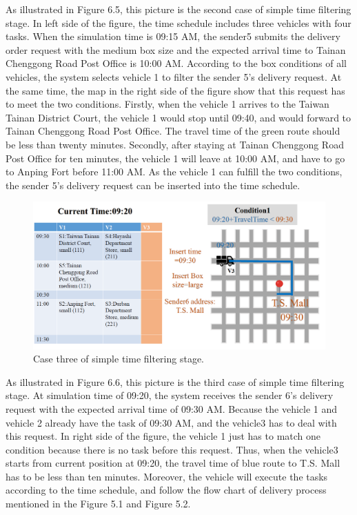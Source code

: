 \documentclass[12pt]{ksthesis}
\begin{document}
\begin{thesis}
{As illustrated in Figure 6.5, this picture is the second case of simple time filtering stage. In left side of the figure, the time schedule includes three vehicles with four tasks. When the simulation time is 09:15 AM, the sender5 submits the delivery order request with the medium box size and the expected arrival time to Tainan Chenggong Road Post Office is 10:00 AM.
According to the box conditions of all vehicles, the system selects vehicle 1 to filter the sender 5’s delivery request. At the same time, the map in the right side of the figure show that this request has to meet the two conditions. Firstly, when the vehicle 1 arrives to the Taiwan Tainan District Court, the vehicle 1 would stop until 09:40, and would forward to Tainan Chenggong Road Post Office. The travel time of the green route should be less than twenty minutes. Secondly, after staying at Tainan Chenggong Road Post Office for ten minutes, the vehicle 1 will leave at 10:00 AM, and have to go to Anping Fort before 11:00 AM. 
As the vehicle 1 can fulfill the two conditions, the sender 5’s delivery request can be inserted into the time schedule.




\begin{figure}[H]
\centering
\includegraphics[width=1.14\textwidth]{./Thesis_figures/F6-6_caseThree_SchedulingStage.PNG}
\caption{\large Case three of simple time filtering stage.}
\vspace{0.5cm}
\label{Fig:CaseThree_TimeFiltering}
\end{figure}

As illustrated in Figure 6.6, this picture is the third case of simple time filtering stage. At simulation time of 09:20, the system receives the sender 6’s delivery request with the expected arrival time of 09:30 AM. Because the vehicle 1 and vehicle 2 already have the task of 09:30 AM, and the vehicle3 has to deal with this request. In right side of the figure, the vehicle 1 just has to match one condition because there is no task before this request. Thus, when the vehicle3 starts from current position at 09:20, the travel time of blue route to T.S. Mall has to be less than ten minutes.
Moreover, the vehicle will execute the tasks according to the time schedule, and follow the flow chart of delivery process mentioned in the Figure 5.1 and Figure 5.2.


}
\end{thesis}
\end{document}
